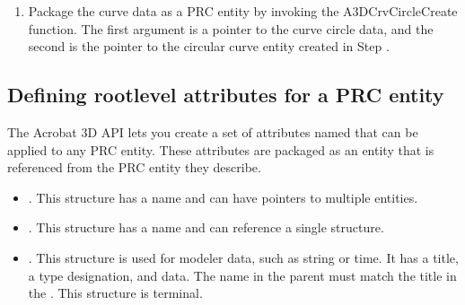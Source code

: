 \documentclass[letterpaper,12pt,english,openany,oneside]{sphinxmanual}
\begin{document}
\begin{sphinxVerbatim}[commandchars=\\\{\}]
  
\end{sphinxVerbatim}
\begin{enumerate}
%
\setcounter{enumi}{5}
\item {} 
Package the curve data as a PRC entity by invoking the A3DCrvCircleCreate function. The first argument is a pointer to the curve circle data, and the second is the pointer to the circular curve entity created in Step .

\end{enumerate}

\begin{sphinxVerbatim}[commandchars=\\\{\}]
    
\end{sphinxVerbatim}


\subsection{Defining root\sphinxhyphen{}level attributes for a PRC entity}
\label{\detokenize{Plugins_A3D_API:defining-root-level-attributes-for-a-prc-entity}}
The Acrobat 3D API lets you create a set of attributes named  that can be applied to any PRC entity. These attributes are packaged as an  entity that is referenced from the PRC entity they describe.
\begin{itemize}
\item {} 
. This structure has a name and can have pointers to multiple  entities.

\item {} 
. This structure has a name and can reference a single  structure.

\item {} 
. This structure is used for modeler data, such as string or time. It has a title, a type designation, and data. The name in the parent  must match the title in the . This structure is terminal.

\end{itemize}
\end{document}
